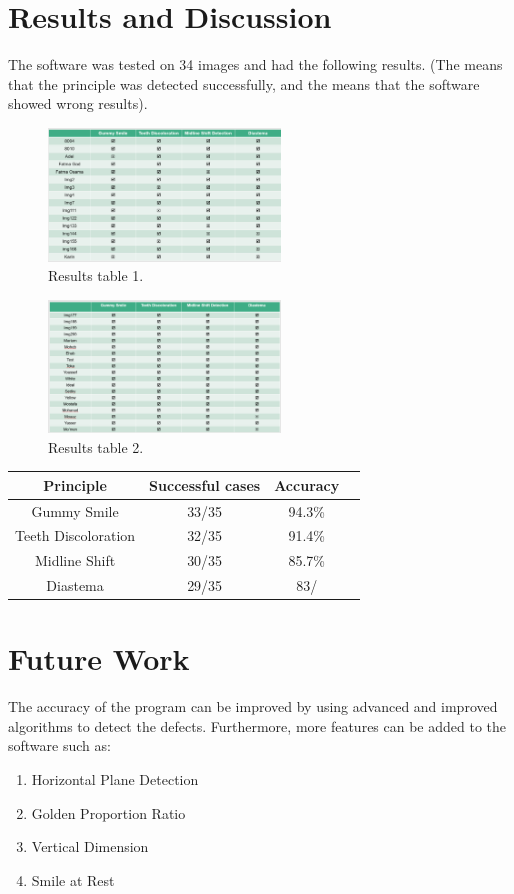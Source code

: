 \documentclass[conference,twocolumn]{IEEEtran}
\begin{document}
\section{Results and Discussion}
The software was tested on 34 images and had the following results. (The \checkmark means that the principle was detected successfully, and the  means that the software showed wrong results).

\begin{figure}[H]
    \centering
    \includegraphics[width=0.55\textwidth]{Screenshot_1.png}
    \caption{Results table 1.}
    \label{fig:my_label}
\end{figure}
\begin{figure}[H]
    \centering
    \includegraphics[width=0.55\textwidth]{Screenshot_2.png}
    \caption{Results table 2.}
    \label{fig:my_label}
\end{figure}
\begin{center}
\begin{tabular}{||c c c c||} 
 \hline
 Principle & Successful cases & Accuracy \\ [0.5ex] 
 \hline\hline
 Gummy Smile & 33/35 & 94.3\% \\
 \hline
 Teeth Discoloration & 32/35 & 91.4\% \\
 \hline
 Midline Shift & 30/35 & 85.7\% \\
 \hline
 Diastema & 29/35 & 83/& \\ [1ex] 
 \hline
\end{tabular}
\end{center}
\section{Future Work}
The accuracy of the program can be improved by using advanced and improved algorithms to detect the defects. Furthermore, more features can be added to the software such as:
\begin{enumerate}
    \item Horizontal Plane Detection
    \item Golden Proportion Ratio
    \item Vertical Dimension 
    \item Smile at Rest
\end{enumerate}
\end{document}
